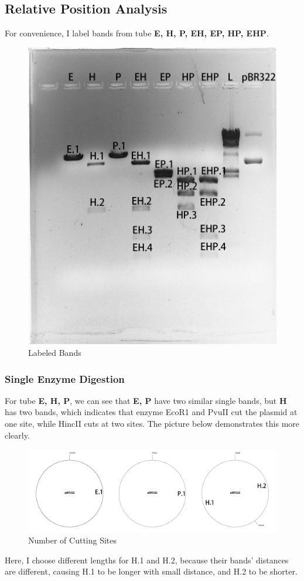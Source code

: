 \documentclass{article}
\begin{document}
        \subsection{Relative Position Analysis}
            For convenience, I label bands from tube \textbf{E, H, P, EH, EP, HP, EHP}.
            \begin{figure}[H]
                \centering
                \includegraphics[width = 0.5\linewidth]{../Data/xun_and_sam_label.png}
                \caption{Labeled Bands}
                \label{label.bands}
            \end{figure}
            \subsubsection{Single Enzyme Digestion}
                For tube \textbf{E, H, P}, we can see that \textbf{E, P} have two similar single bands, but \textbf{H} has two bands, which indicates that enzyme EcoR1 and PvuII cut the plasmid at one site, while HincII cuts at two sites. The picture below demonstrates this more clearly.
                \begin{figure}[H]
                    \centering
                    \includegraphics[width = 0.9\linewidth]{../Data/Plasmid/single.png}
                    \caption{Number of Cutting Sites}
                    \label{single.cut}
                \end{figure}
                Here, I choose different lengths for H.1 and H.2, because their bands' distances are different, causing H.1 to be longer with small distance, and H.2 to be shorter.
\end{document}
